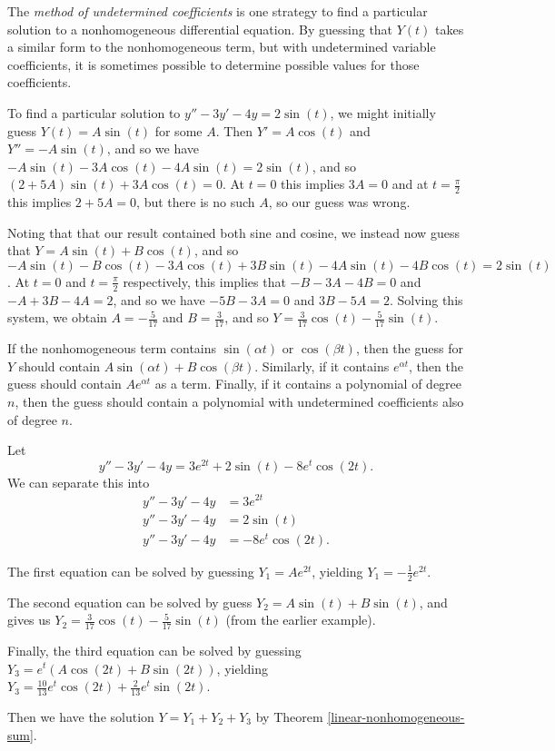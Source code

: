 \begin{defn}
    The \emph{method of undetermined coefficients} is one strategy to find a particular solution to a nonhomogeneous differential equation. By guessing that $Y(t)$ takes a similar form to the nonhomogeneous term, but with undetermined variable coefficients, it is sometimes possible to determine possible values for those coefficients.
\end{defn}

\begin{exmp}
    To find a particular solution to $y'' - 3y' - 4y = 2\sin(t)$, we might initially guess $Y(t) = A\sin(t)$ for some $A$. Then $Y' = A\cos(t)$ and $Y'' = -A\sin(t)$, and so we have $-A\sin(t) - 3A\cos(t) - 4A\sin(t) = 2\sin(t)$, and so $(2 + 5A)\sin(t) + 3A\cos(t) = 0$. At $t = 0$ this implies $3A = 0$ and at $t = \frac{\pi}{2}$ this implies $2 + 5A = 0$, but there is no such $A$, so our guess was wrong.

    Noting that that our result contained both sine and cosine, we instead now guess that $Y = A\sin(t) + B\cos(t)$, and so $-A\sin(t) - B\cos(t) - 3A\cos(t) + 3B\sin(t) - 4A\sin(t) - 4B\cos(t) = 2\sin(t)$. At $t = 0$ and $t = \frac{\pi}{2}$ respectively, this implies that $-B - 3A - 4B = 0$ and $-A + 3B - 4A = 2$, and so we have $-5B - 3A = 0$ and $3B - 5A = 2$. Solving this system, we obtain $A = -\frac{5}{17}$ and $B = \frac{3}{17}$, and so $Y = \frac{3}{17}\cos(t) - \frac{5}{17}\sin(t)$.
\end{exmp}

\begin{rmk}
    If the nonhomogeneous term contains $\sin(\alpha t)$ or $\cos(\beta t)$, then the guess for $Y$ should contain $A\sin(\alpha t) + B\cos(\beta t)$. Similarly, if it contains $e^{\alpha t}$, then the guess should contain $Ae^{\alpha t}$ as a term. Finally, if it contains a polynomial of degree $n$, then the guess should contain a polynomial with undetermined coefficients also of degree $n$.
\end{rmk}

\begin{exmp}
    Let \[y'' - 3y' - 4y = 3e^{2t} + 2\sin(t) - 8e^{t}\cos(2t).\]
    We can separate this into
    \begin{align*}
        y'' - 3y' - 4y &= 3e^{2t} \\
        y'' - 3y' - 4y &= 2\sin(t) \\
        y'' - 3y' - 4y &= -8e^{t}\cos(2t).
    \end{align*}

    The first equation can be solved by guessing $Y_1 = Ae^{2t}$, yielding $Y_1 = -\frac{1}{2}e^{2t}$.

    The second equation can be solved by guess $Y_2 = A\sin(t) + B\sin(t)$, and gives us $Y_2 = \frac{3}{17}\cos(t) - \frac{5}{17}\sin(t)$ (from the earlier example).

    Finally, the third equation can be solved by guessing $Y_3 = e^{t}(A\cos(2t) + B\sin(2t))$, yielding $Y_3 = \frac{10}{13}e^{t}\cos(2t) + \frac{2}{13}e^{t}\sin(2t)$.

    Then we have the solution $Y = Y_1 + Y_2 + Y_3$ by Theorem \ref{linear-nonhomogeneous-sum}.
\end{exmp}

